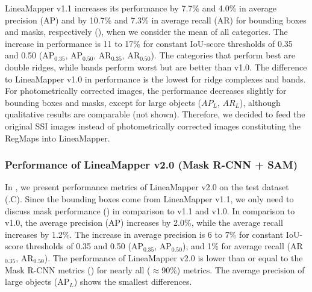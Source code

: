 LineaMapper v1.1 increases its performance by 7.7\% and 4.0\% in average precision (AP) and by 10.7\% and 7.3\% in average recall (AR) for bounding boxes and masks, respectively (), when we consider the mean of all categories. The increase in performance is 11 to 17\% for constant IoU-score thresholds of 0.35 and 0.50 (AP$_{0.35}$, AP$_{0.50}$, AR$_{0.35}$, AR$_{0.50}$). The categories that perform best are double ridges, while bands perform worst but are better than v1.0. The difference to LineaMapper v1.0 in performance is the lowest for ridge complexes and bands.
For photometrically corrected images, the performance decreases slightly for bounding boxes and masks, except for large objects ($AP_L$, $AR_L$), although qualitative results are comparable (not shown). Therefore, we decided to feed the original SSI images instead of photometrically corrected images constituting the RegMaps into LineaMapper.


\subsubsection{Performance of LineaMapper v2.0 (Mask R-CNN + SAM)}\label{sec:LM2.0}
In , we present performance metrics of LineaMapper v2.0 on the test dataset (.C). Since the bounding boxes come from LineaMapper v1.1, we only need to discuss mask performance () in comparison to v1.1 and v1.0. In comparison to v1.0, the average precision (AP) increases by 2.0\%, while the average recall increases by 1.2\%. %
The increase in average precision is 6 to 7\% for constant IoU-score thresholds of 0.35 and 0.50 (AP$_{0.35}$, AP$_{0.50}$), and 1\% for average recall (AR$_{0.35}$, AR$_{0.50}$).
The performance of LineaMapper v2.0 is lower than or equal to the Mask R-CNN metrics () for nearly all ($\approx$90\%) metrics. The average precision of large objects (AP$_{L}$) shows the smallest differences. 

